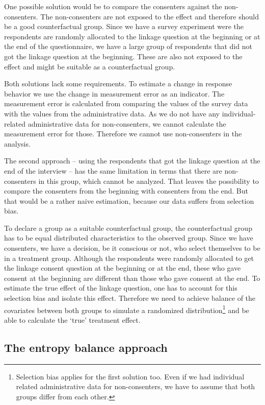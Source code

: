 One possible solution would be to compare the consenters against the non-consenters. The non-consenters are not exposed to the effect and therefore should be a good counterfactual group. Since we have a survey experiment were the respondents are randomly allocated to the linkage question at the beginning or at the end of the questionnaire, we have a large group of respondents that did not got the linkage question at the beginning. These are also not exposed to the effect and might be suitable as a counterfactual group.

Both solutions lack some requirements. To estimate a change in response behavior we use the change in measurement error as an indicator. The measurement error is calculated from comparing the values of the survey data with the values from the administrative data. As we do not have any individual-related administrative data for non-consenters, we cannot calculate the measurement error for those. Therefore we cannot use non-consenters in the analysis.

The second approach -- using the respondents that got the linkage question at the end of the interview -- has the same limitation in terms that there are non-consenters in this group, which cannot be analyzed. That leaves the possibility to compare the consenters from the beginning with consenters from the end. But that would be a rather naive estimation, because our data suffers from selection bias.

To declare a group as a suitable counterfactual group, the counterfactual group has to be equal distributed characteristics to the observed group. Since we have consenters, we have a decision, be it conscious or not, who select themselves to be in a treatment group. Although the respondents were randomly allocated to get the linkage consent question at the beginning or at the end, these who gave consent at the beginning are different than those who gave consent at the end. To estimate the true effect of the linkage question, one has to account for this selection bias and isolate this effect. Therefore we need to achieve balance of the covariates between both groups to simulate a randomized distribution\footnote{Selection bias applies for the first solution too. Even if we had individual related administrative data for non-consenters, we have to assume that both groups differ from each other.} and be able to calculate the `true' treatment effect.

\subsection{The entropy balance approach}

